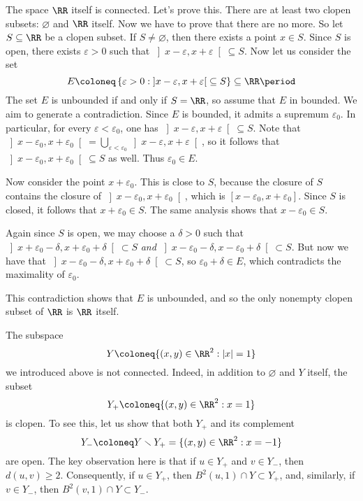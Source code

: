 \begin{exm}
	The space $\RR$ itself is connected.
	Let's prove this.
	There are at least two clopen subsets: $\varnothing$ and $\RR$ itself.
	Now we have to prove that there are no more.
	So let $S \subseteq \RR$ be a clopen subset.
	If $S \neq \varnothing$, then there exists a point $x \in S$.
	Since $S$ is open, there exists $\varepsilon >0$ such that $\left]x-\varepsilon, x+\varepsilon\right[ \subseteq S$.
	Now let us consider the set
	\[
		E \coloneq \left\{ \varepsilon >0 : \left]x-\varepsilon, x+\varepsilon\right[  \subseteq S \right\} \subseteq \RR \period
	\]
	The set $E$ is unbounded if and only if $S = \RR$, so assume that $E$ in bounded.
	We aim to generate a contradiction.
	Since $E$ is bounded, it admits a supremum $\varepsilon_0$.
	In particular, for every $\varepsilon < \varepsilon_0$, one has $\left]x-\varepsilon, x+\varepsilon\right[  \subseteq S$.
	Note that $\left]x-\varepsilon_0, x+\varepsilon_0\right[  = \bigcup_{\varepsilon < \varepsilon_0} \left]x-\varepsilon, x+\varepsilon\right[ $, so it follows that $\left]x-\varepsilon_0, x+\varepsilon_0\right[ \subseteq S$ as well.
	Thus $\varepsilon_0 \in E$.

	Now consider the point $x+\varepsilon_0$.
	This is close to $S$, because the closure of $S$ contains the closure of $\left]x-\varepsilon_0, x+\varepsilon_0\right[$, which is $[x-\varepsilon_0,x+\varepsilon_0]$. 
	Since $S$ is closed, it follows that $x +\varepsilon_0 \in S$.
	The same analysis shows that $x-\varepsilon_0 \in S$.

	Again since $S$ is open, we may choose a $\delta>0$ such that $\left]x+\varepsilon_0-\delta, x+\varepsilon_0+\delta\right[ \subset S$ \emph{and} $\left]x-\varepsilon_0-\delta, x-\varepsilon_0+\delta\right[ \subset S$.
	But now we have that $\left]x-\varepsilon_0-\delta, x+\varepsilon_0+\delta\right[ \subset S$, so $\varepsilon_0+\delta \in E$, which contradicts the maximality of $\varepsilon_0$.

	This contradiction shows that $E$ is unbounded, and so the only nonempty clopen subset of $\RR$ is $\RR$ itself.
\end{exm}

\begin{exm}
	The subspace
	\[
		Y \coloneq \{(x,y) \in \RR^2 : |x|=1 \}
	\]
	we introduced above is not connected.
	Indeed, in addition to $\varnothing $ and $Y$ itself, the subset
	\[
		Y_+ \coloneq \{(x,y) \in \RR^2 : x=1 \}
	\]
	is clopen.
	To see this, let us show that both $Y_+$ and its complement
	\[
		Y_- \coloneq Y \smallsetminus Y_+ = \{ (x,y) \in \RR^2 : x = -1 \}
	\]
	are open.
	The key observation here is that if $ u \in Y_+$ and $v \in Y_-$, then $d(u,v) \geq 2$.
	Consequently, if $u \in Y_+$, then $B^2(u,1) \cap Y \subset Y_+$, and, similarly, if $v \in Y_-$, then $B^2(v,1) \cap Y \subset Y_-$.
\end{exm}

